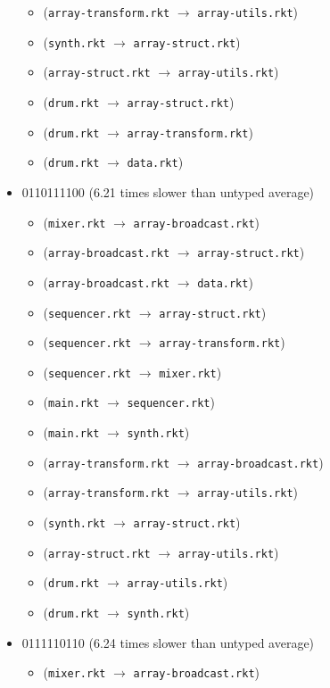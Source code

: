 \documentclass{article}
\newcommand{\mono}[1]{\texttt{#1}}
\begin{document}
\begin{itemize}
\begin{itemize}
  \item (\mono{array-transform.rkt} $\rightarrow$ \mono{array-utils.rkt})
  \item (\mono{synth.rkt} $\rightarrow$ \mono{array-struct.rkt})
  \item (\mono{array-struct.rkt} $\rightarrow$ \mono{array-utils.rkt})
  \item (\mono{drum.rkt} $\rightarrow$ \mono{array-struct.rkt})
  \item (\mono{drum.rkt} $\rightarrow$ \mono{array-transform.rkt})
  \item (\mono{drum.rkt} $\rightarrow$ \mono{data.rkt})
  \end{itemize}
\item 0110111100 (6.21 times slower than untyped average)
  \begin{itemize}
  \item (\mono{mixer.rkt} $\rightarrow$ \mono{array-broadcast.rkt})
  \item (\mono{array-broadcast.rkt} $\rightarrow$ \mono{array-struct.rkt})
  \item (\mono{array-broadcast.rkt} $\rightarrow$ \mono{data.rkt})
  \item (\mono{sequencer.rkt} $\rightarrow$ \mono{array-struct.rkt})
  \item (\mono{sequencer.rkt} $\rightarrow$ \mono{array-transform.rkt})
  \item (\mono{sequencer.rkt} $\rightarrow$ \mono{mixer.rkt})
  \item (\mono{main.rkt} $\rightarrow$ \mono{sequencer.rkt})
  \item (\mono{main.rkt} $\rightarrow$ \mono{synth.rkt})
  \item (\mono{array-transform.rkt} $\rightarrow$ \mono{array-broadcast.rkt})
  \item (\mono{array-transform.rkt} $\rightarrow$ \mono{array-utils.rkt})
  \item (\mono{synth.rkt} $\rightarrow$ \mono{array-struct.rkt})
  \item (\mono{array-struct.rkt} $\rightarrow$ \mono{array-utils.rkt})
  \item (\mono{drum.rkt} $\rightarrow$ \mono{array-utils.rkt})
  \item (\mono{drum.rkt} $\rightarrow$ \mono{synth.rkt})
  \end{itemize}
\item 0111110110 (6.24 times slower than untyped average)
  \begin{itemize}
  \item (\mono{mixer.rkt} $\rightarrow$ \mono{array-broadcast.rkt})

\end{itemize}
\end{itemize}
\end{document}
